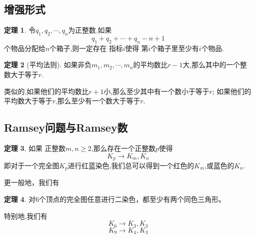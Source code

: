 \documentclass[a4paper,11pt]{article}%
\theoremstyle{remark}
\theoremstyle{remark}
\theoremstyle{definition}
\newtheorem{theorem}{定理}[section]
\theoremstyle{definition}
\theoremstyle{definition}
\begin{document}
\subsection{增强形式}
\begin{theorem}
    令$q_1,q_2,\cdots,q_n$为正整数.如果
    \[q_1+q_2+\cdots+q_n-n+1\]
    个物品分配给$n$个箱子,则一定存在 指标$i$使得
    第$i$个箱子里至少有$i$个物品.
\end{theorem}
\begin{theorem}[平均法则]
   如果非负$m_1,m_2,\cdots,m_n$的平均数比$r-1$大,那么其中的一个整数大于等于$r$.
   
   类似的,如果他们的平均数比$r+1$小,那么至少其中有一个数小于等于$r$;
   如果他们的平均数大于等于$r$,那么至少有一个数大于等于$r$.
\end{theorem}
\subsection{Ramsey问题与Ramsey数}
\begin{theorem}
    如果 正整数$m,n\geq 2$,那么存在一个正整数$p$使得 
    \[K_p\rightarrow K_m,K_n\]
    即对于一个完全图$K_p$进行红蓝染色,我们总可以得到一个红色的$K_m$,或蓝色的$K_n$.
\end{theorem}
更一般地，我们有
\begin{theorem}
    对6个顶点的完全图任意进行二染色，都至少有两个同色三角形。
\end{theorem}
特别地,我们有 
\[K_6\rightarrow K_3,K_3\]
\[K_{9}\rightarrow K_4,K_3\]
\end{document}
